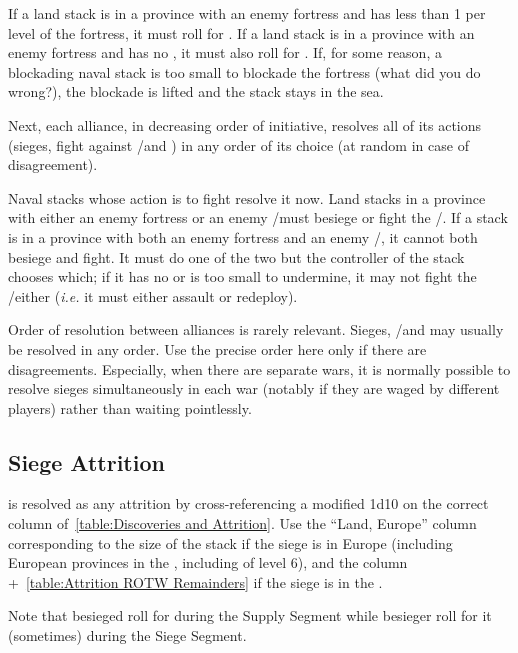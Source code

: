 If a land stack is in a province with an enemy fortress and has less than 1\LD
per level of the fortress, it must roll for . If a land
stack is in a province with an enemy fortress and has no \LoS, it must also
roll for . If, for some reason, a blockading naval
stack is too small to blockade the fortress (what did you do wrong?), the
blockade is lifted and the stack stays in the sea.

Next, each alliance, in decreasing order of initiative, resolves all of its
actions (sieges, fight against \REVOLT/\REBELLION and \corsaire) in any order
of its choice (at random in case of disagreement).

Naval stacks whose action is to fight \corsaire resolve it now. Land stacks in
a province with either an enemy fortress or an enemy \REVOLT/\REBELLION must
besiege or fight the \REVOLT/\REBELLION. If a stack is in a province with both
an enemy fortress and an enemy \REVOLT/\REBELLION, it cannot both besiege and
fight. It must do one of the two but the controller of the stack chooses
which; if it has no \LoS or is too small to undermine, it may not fight the
\REVOLT/\REBELLION either (\emph{i.e.} it must either assault or redeploy).

\begin{designnote}
  Order of resolution between alliances is rarely relevant. Sieges,
  \REVOLT/\REBELLION and \corsaire may usually be resolved in any order. Use
  the precise order here only if there are disagreements. Especially, when
  there are separate wars, it is normally possible to resolve sieges
  simultaneously in each war (notably if they are waged by different players)
  rather than waiting pointlessly.
\end{designnote}

\subsection{Siege Attrition}
 is resolved as any attrition by cross-referencing a
modified 1d10 on the correct column of~\ref{table:Discoveries and
  Attrition}. Use the ``Land, Europe'' column corresponding to the size of the
stack if the siege is in Europe (including European provinces in the \ROTW,
including \COL of level 6), and the \ROTW column +~\ref{table:Attrition ROTW
  Remainders} if the siege is in the \ROTW.

Note that besieged roll for  during the Supply Segment
while besieger roll for it (sometimes) during the Siege Segment.

